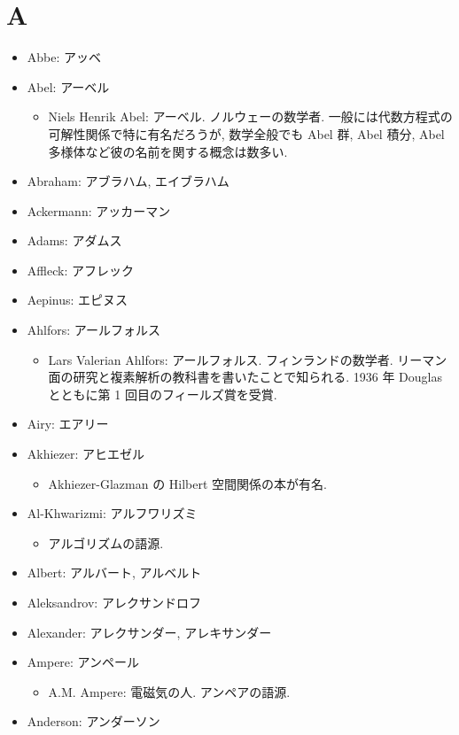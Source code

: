 \documentclass[openany, a4paper, oneside]{jsbook}
\begin{document}
\section{A}

\begin{itemize}
\item Abbe: アッベ
\item Abel: アーベル
\begin{itemize}
\item Niels Henrik Abel: アーベル. ノルウェーの数学者. 一般には代数方程式の可解性関係で特に有名だろうが, 数学全般でも Abel 群, Abel 積分, Abel 多様体など彼の名前を関する概念は数多い.
\end{itemize}
\item Abraham: アブラハム, エイブラハム
\item Ackermann: アッカーマン
\item Adams: アダムス
\item Affleck: アフレック
\item Aepinus: エピヌス
\item Ahlfors: アールフォルス
\begin{itemize}
\item Lars Valerian Ahlfors: アールフォルス. フィンランドの数学者. リーマン面の研究と複素解析の教科書を書いたことで知られる. 1936 年 Douglas とともに第 1 回目のフィールズ賞を受賞.
\end{itemize}
\item Airy: エアリー
\item Akhiezer: アヒエゼル
\begin{itemize}
\item Akhiezer-Glazman の Hilbert 空間関係の本が有名.
\end{itemize}
\item Al-Khwarizmi: アルフワリズミ
\begin{itemize}
\item アルゴリズムの語源.
\end{itemize}
\item Albert: アルバート, アルベルト
\item Aleksandrov: アレクサンドロフ
\item Alexander: アレクサンダー, アレキサンダー
\item Ampere: アンペール
\begin{itemize}
\item A.M. Ampere: 電磁気の人. アンペアの語源.
\end{itemize}
\item Anderson: アンダーソン

\end{itemize}
\end{document}
